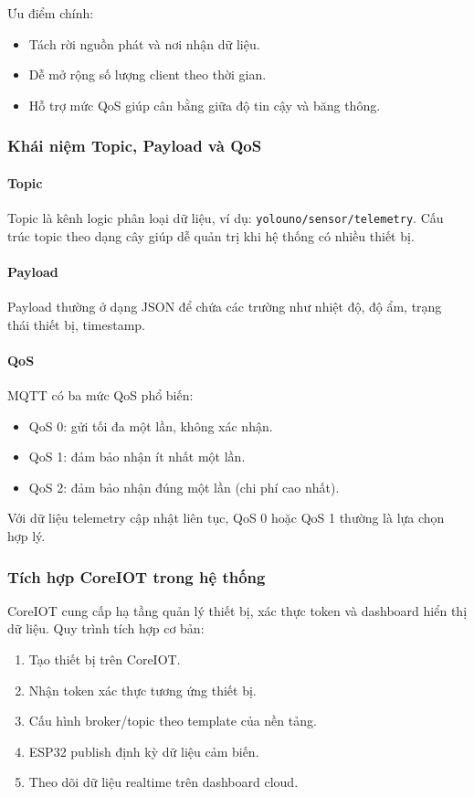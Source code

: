 Ưu điểm chính:
\begin{itemize}
    \item Tách rời nguồn phát và nơi nhận dữ liệu.
    \item Dễ mở rộng số lượng client theo thời gian.
    \item Hỗ trợ mức QoS giúp cân bằng giữa độ tin cậy và băng thông.
\end{itemize}

\subsubsection*{Khái niệm Topic, Payload và QoS}

\paragraph{Topic}
Topic là kênh logic phân loại dữ liệu, ví dụ: \texttt{yolouno/sensor/telemetry}. Cấu trúc topic theo dạng cây giúp dễ quản trị khi hệ thống có nhiều thiết bị.

\paragraph{Payload}
Payload thường ở dạng JSON để chứa các trường như nhiệt độ, độ ẩm, trạng thái thiết bị, timestamp.

\paragraph{QoS}
MQTT có ba mức QoS phổ biến:
\begin{itemize}
    \item QoS 0: gửi tối đa một lần, không xác nhận.
    \item QoS 1: đảm bảo nhận ít nhất một lần.
    \item QoS 2: đảm bảo nhận đúng một lần (chi phí cao nhất).
\end{itemize}

Với dữ liệu telemetry cập nhật liên tục, QoS 0 hoặc QoS 1 thường là lựa chọn hợp lý.

\subsubsection*{Tích hợp CoreIOT trong hệ thống}

CoreIOT cung cấp hạ tầng quản lý thiết bị, xác thực token và dashboard hiển thị dữ liệu. Quy trình tích hợp cơ bản:
\begin{enumerate}
    \item Tạo thiết bị trên CoreIOT.
    \item Nhận token xác thực tương ứng thiết bị.
    \item Cấu hình broker/topic theo template của nền tảng.
    \item ESP32 publish định kỳ dữ liệu cảm biến.
    \item Theo dõi dữ liệu realtime trên dashboard cloud.
\end{enumerate}

